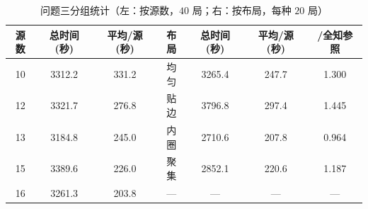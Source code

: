 \documentclass[withoutpreface, bwprint]{cumcmthesis}
\begin{document}
\begin{appendices}
\begin{table}[htbp]
  \centering
  \caption{问题三分组统计（左：按源数，$40$ 局；右：按布局，每种 $20$ 局）}
  \label{tab:p3group}
  \begin{tabular}{ccc@{\hskip 0.5cm}cccc}
    \toprule
    源数 & 总时间(秒) & 平均/源(秒) & 布局 & 总时间(秒) & 平均/源(秒) & /全知参照 \\
    \midrule
    10 & 3312.2 & 331.2 & 均匀 & 3265.4 & 247.7 & 1.300 \\
    12 & 3321.7 & 276.8 & 贴边 & 3796.8 & 297.4 & 1.445 \\
    13 & 3184.8 & 245.0 & 内圈 & 2710.6 & 207.8 & 0.964 \\
    15 & 3389.6 & 226.0 & 聚集 & 2852.1 & 220.6 & 1.187 \\
    16 & 3261.3 & 203.8 & --- & --- & --- & --- \\
    \bottomrule
  \end{tabular}
\end{table}


\end{appendices}
\end{document}
